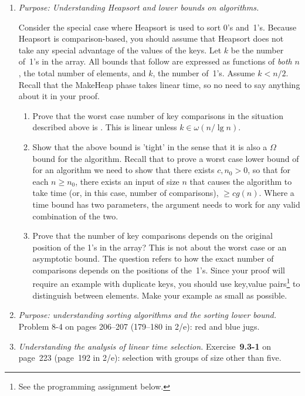 \documentclass{article}
\begin{document}
\begin{enumerate}
\item {}
  \emph{Purpose: Understanding Heapsort and lower bounds on algorithms.}

  Consider the special case where Heapsort is used to sort 0's and~1's.
  Because Heapsort is comparison-based, you should assume that Heapsort
  does not take any special advantage of the values of the keys.
  Let $k$ be the number of~1's in the array.
  All bounds that follow are expressed as functions of \emph{both} $n$,
  the total number of elements, and $k$, the number of~1's.
  Assume $k < n/2$. Recall that the MakeHeap phase takes linear time, so
  no need to say anything about it in your proof.

  \begin{enumerate}
  \item Prove that the worst case number of key comparisons in the
    situation described above is .
    This is linear unless $k \in \omega(n/\lg n)$.

  \item
    Show that the above bound is 'tight' in the sense that it is also a
    $\Omega$ bound for the algorithm.  Recall that to prove a worst case
    lower bound of  for an algorithm we need to show that
    there exists $c,n_0 > 0$, so that for each $n \geq n_0$,
    there exists an input of size $n$ that causes the algorithm to take
    time (or, in this case, number of comparisons), $\geq c g(n)$.
    Where a time bound has two parameters, the argument needs to work
    for any valid combination of the two.

  \item
    Prove that the number of key comparisons depends on the original position of the
    1's in the array? This is not about the worst case or an
    asymptotic bound. The question refers to how the exact number of comparisons
    depends on the positions of the~1's.
    Since your proof will require an example with duplicate keys, you should use
    \textsf{key,value} pairs\footnote{See the programming assignment
      below.}
    to distinguish between elements. Make your example as small as possible.

  \end{enumerate}

  \newpage
\item {} \emph{Purpose: understanding sorting algorithms and the sorting lower bound.}
  Problem 8-4 on pages 206--207 (179--180 in 2/e): red and blue jugs.

  \newpage
\item {}
  \emph{Understanding the analysis of linear time selection.}
  Exercise~\textbf{9.3-1} on page~223 (page~192 in 2/e): selection with
  groups of size other than five.
  
  
\end{enumerate} %

\label{last}
\end{document}
